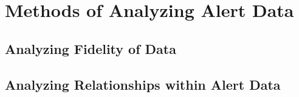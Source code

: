 


\section{Methods of Analyzing Alert Data}

\subsection{Analyzing Fidelity of Data}

\subsection{Analyzing Relationships within Alert Data}
